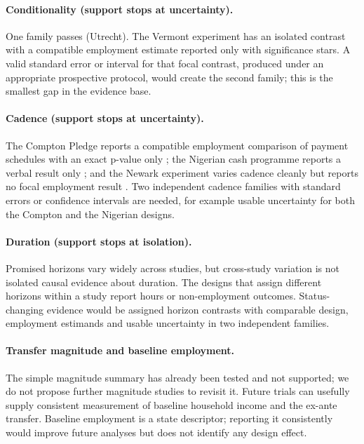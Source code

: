 \documentclass[11pt]{article}
\begin{document}
\paragraph{Conditionality (support stops at uncertainty).} One family passes (Utrecht). The Vermont experiment has an isolated contrast with a compatible employment estimate reported only with significance stars. A valid standard error or interval for that focal contrast, produced under an appropriate prospective protocol, would create the second family; this is the smallest gap in the evidence base.

\paragraph{Cadence (support stops at uncertainty).} The Compton Pledge reports a compatible employment comparison of payment schedules with an exact p-value only \citep{balakrishnan2024}; the Nigerian cash programme reports a verbal result only \citep{bastian2017}; and the Newark experiment varies cadence cleanly but reports no focal employment result \citep{tandon2025}. Two independent cadence families with standard errors or confidence intervals are needed, for example usable uncertainty for both the Compton and the Nigerian designs.

\paragraph{Duration (support stops at isolation).} Promised horizons vary widely across studies, but cross-study variation is not isolated causal evidence about duration. The designs that assign different horizons within a study report hours or non-employment outcomes. Status-changing evidence would be assigned horizon contrasts with comparable design, employment estimands and usable uncertainty in two independent families.

\paragraph{Transfer magnitude and baseline employment.} The simple magnitude summary has already been tested and not supported; we do not propose further magnitude studies to revisit it. Future trials can usefully supply consistent measurement of baseline household income and the ex-ante transfer. Baseline employment is a state descriptor; reporting it consistently would improve future analyses but does not identify any design effect.
\end{document}
